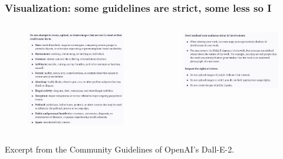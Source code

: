 \documentclass[
	11pt, compress%
]{beamer}
\begin{document}
\begin{frame}
	\frametitle{Visualization: some guidelines are strict, some less so I}
	\begin{columns}[c] 
		\begin{column}{0.5\textwidth} %
			\begin{figure}
				\includegraphics[width=0.9\linewidth]{Images/CommunityGuidelinesDALLE2_1.png}
			\end{figure}
		\end{column}
		\begin{column}{0.5\textwidth} %
			\begin{figure}
				\includegraphics[width=0.9\linewidth]{Images/CommunityGuidelinesDALLE2_2.png}
			\end{figure}
		\end{column}
	\end{columns}
	\smallskip
	\tiny Excerpt from the Community Guidelines of OpenAI's Dall-E-2\cite{DallETOS}.
\end{frame}
\end{document}
